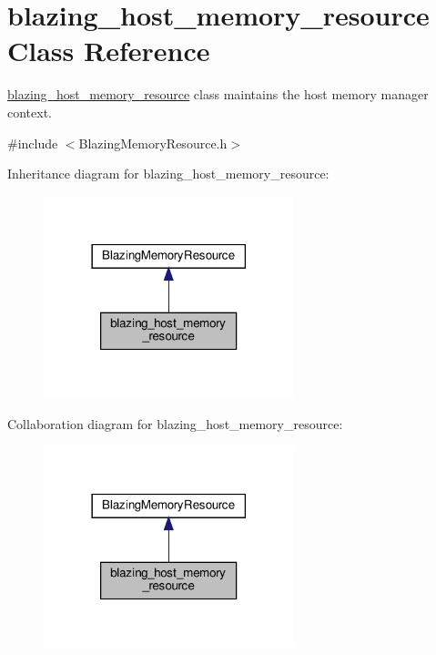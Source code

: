 \hypertarget{classblazing__host__memory__resource}{}\section{blazing\+\_\+host\+\_\+memory\+\_\+resource Class Reference}
\label{classblazing__host__memory__resource}


\hyperlink{classblazing__host__memory__resource}{blazing\+\_\+host\+\_\+memory\+\_\+resource} class maintains the host memory manager context.  




{\ttfamily \#include $<$Blazing\+Memory\+Resource.\+h$>$}



Inheritance diagram for blazing\+\_\+host\+\_\+memory\+\_\+resource\+:\nopagebreak
\begin{figure}[H]
\begin{center}
\leavevmode
\includegraphics[width=206pt]{classblazing__host__memory__resource__inherit__graph}
\end{center}
\end{figure}


Collaboration diagram for blazing\+\_\+host\+\_\+memory\+\_\+resource\+:\nopagebreak
\begin{figure}[H]
\begin{center}
\leavevmode
\includegraphics[width=206pt]{classblazing__host__memory__resource__coll__graph}
\end{center}
\end{figure}
